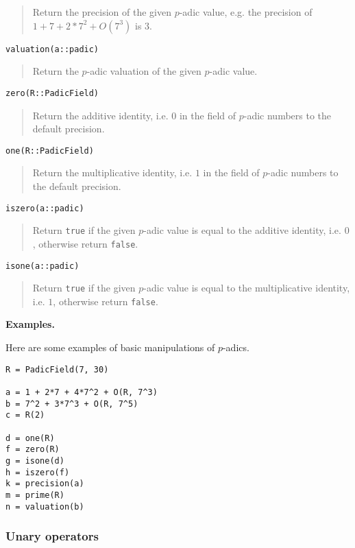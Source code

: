 \documentclass[a4paper,10pt]{article}
\newcommand{\code}{\lstinline}
\newcommand{\desc}[1]{\vspace{-3mm}\begin{quote}#1\end{quote}}
\begin{document}
{{\desc{Return the precision of the given $p$-adic value, e.g. the precision of
$1 + 7 + 2*7^2 + O(7^3)$ is $3$.}

\begin{lstlisting}
valuation(a::padic)
\end{lstlisting}

\desc{Return the $p$-adic valuation of the given $p$-adic value.}

\begin{lstlisting}
zero(R::PadicField)
\end{lstlisting}

\desc{Return the additive identity, i.e. $0$ in the field of $p$-adic
numbers to the default precision.}

\begin{lstlisting}
one(R::PadicField)
\end{lstlisting}

\desc{Return the multiplicative identity, i.e. $1$ in the field of
$p$-adic numbers to the default precision.}

\begin{lstlisting}
iszero(a::padic)
\end{lstlisting}

\desc{Return \code{true} if the given $p$-adic value is equal to the additive identity,
i.e. $0$, otherwise return \code{false}.}

\begin{lstlisting}
isone(a::padic)
\end{lstlisting}

\desc{Return \code{true} if the given $p$-adic value is equal to the multiplicative
identity, i.e. $1$, otherwise return \code{false}.}

\textbf{Examples.}

Here are some examples of basic manipulations of $p$-adics.

\begin{lstlisting}
R = PadicField(7, 30)

a = 1 + 2*7 + 4*7^2 + O(R, 7^3)
b = 7^2 + 3*7^3 + O(R, 7^5)
c = R(2)

d = one(R)
f = zero(R)
g = isone(d)
h = iszero(f)
k = precision(a)
m = prime(R)
n = valuation(b)
\end{lstlisting}

\subsubsection{Unary operators}

}}
\end{document}
